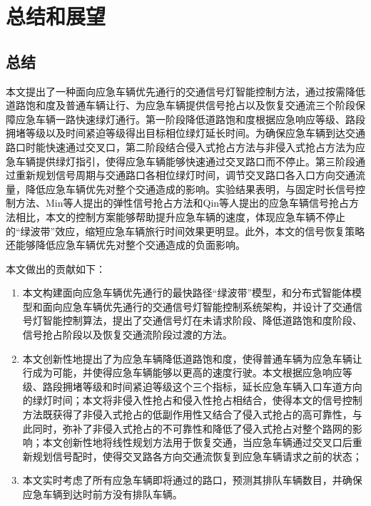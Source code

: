 \chapter{总结和展望}

\section{总结}
本文提出了一种面向应急车辆优先通行的交通信号灯智能控制方法，通过按需降低道路饱和度及普通车辆让行、为应急车辆提供信号抢占以及恢复交通流三个阶段保障应急车辆一路快速绿灯通行。第一阶段降低道路饱和度根据应急响应等级、路段拥堵等级以及时间紧迫等级得出目标相位绿灯延长时间。为确保应急车辆到达交通路口时能快速通过交叉口，第二阶段结合侵入式抢占方法与非侵入式抢占方法为应急车辆提供绿灯指引，使得应急车辆能够快速通过交叉路口而不停止。第三阶段通过重新规划信号周期与交通路口各相位绿灯时间，调节交叉路口各入口方向交通流量，降低应急车辆优先对整个交通造成的影响。实验结果表明，与固定时长信号控制方法、Min等人\cite{min}提出的弹性信号抢占方法和Qin等人\cite{qin_control_2012}提出的应急车辆信号抢占方法相比，本文的控制方案能够帮助提升应急车辆的速度，体现应急车辆不停止的“绿波带”效应，缩短应急车辆旅行时间效果更明显。此外，本文的信号恢复策略还能够降低应急车辆优先对整个交通造成的负面影响。

本文做出的贡献如下：
\begin{enumerate}
	\item 本文构建面向应急车辆优先通行的最快路径“绿波带”模型，和分布式智能体模型和面向应急车辆优先通行的交通信号灯智能控制系统架构，并设计了交通信号灯智能控制算法，提出了交通信号灯在未请求阶段、降低道路饱和度阶段、信号抢占阶段以及恢复交通流阶段过渡的方法。
	\item 本文创新性地提出了为应急车辆降低道路饱和度，使得普通车辆为应急车辆让行成为可能，并使得应急车辆能够以更高的速度行驶。本文根据应急响应等级、路段拥堵等级和时间紧迫等级这个三个指标，延长应急车辆入口车道方向的绿灯时间；本文将非侵入性抢占和侵入性抢占相结合，使得本文的信号控制方法既获得了非侵入式抢占的低副作用性又结合了侵入式抢占的高可靠性，与此同时，弥补了非侵入式抢占的不可靠性和降低了侵入式抢占对整个路网的影响；本文创新性地将线性规划方法用于恢复交通，当应急车辆通过交叉口后重新规划信号配时，使得交叉路各方向交通流恢复到应急车辆请求之前的状态；
	\item 本文实时考虑了所有应急车辆即将通过的路口，预测其排队车辆数目，并确保应急车辆到达时前方没有排队车辆。
\end{enumerate}


